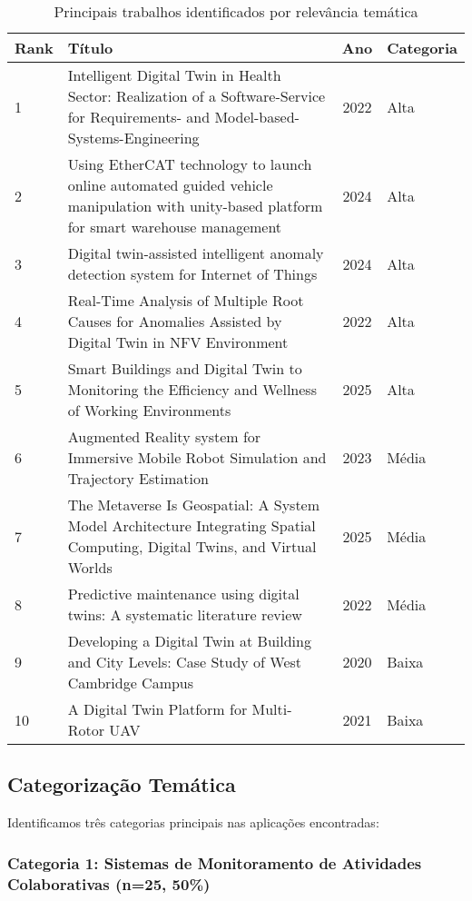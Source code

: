 \documentclass[english, spanish, brazilian]{RBIEarticle} %
\begin{document}
\begin{table}[htbp]
\centering
\caption{Principais trabalhos identificados por relevância temática}
\label{tab:top_works}
\begin{tabularx}{\textwidth}{lXcl}
\toprule
\textbf{Rank} & \textbf{Título} & \textbf{Ano} & \textbf{Categoria} \\
\midrule
1 & Intelligent Digital Twin in Health Sector: Realization of a Software-Service for Requirements- and Model-based-Systems-Engineering & 2022 & Alta \\
2 & Using EtherCAT technology to launch online automated guided vehicle manipulation with unity-based platform for smart warehouse management & 2024 & Alta \\
3 & Digital twin-assisted intelligent anomaly detection system for Internet of Things & 2024 & Alta \\
4 & Real-Time Analysis of Multiple Root Causes for Anomalies Assisted by Digital Twin in NFV Environment & 2022 & Alta \\
5 & Smart Buildings and Digital Twin to Monitoring the Efficiency and Wellness of Working Environments & 2025 & Alta \\
6 & Augmented Reality system for Immersive Mobile Robot Simulation and Trajectory Estimation & 2023 & Média \\
7 & The Metaverse Is Geospatial: A System Model Architecture Integrating Spatial Computing, Digital Twins, and Virtual Worlds & 2025 & Média \\
8 & Predictive maintenance using digital twins: A systematic literature review & 2022 & Média \\
9 & Developing a Digital Twin at Building and City Levels: Case Study of West Cambridge Campus & 2020 & Baixa \\
10 & A Digital Twin Platform for Multi-Rotor UAV & 2021 & Baixa \\
\bottomrule
\end{tabularx}
\end{table}

\subsection{Categorização Temática}

Identificamos três categorias principais nas aplicações encontradas:

\subsubsection{Categoria 1: Sistemas de Monitoramento de Atividades Colaborativas (n=25, 50\%)}
\end{document}
